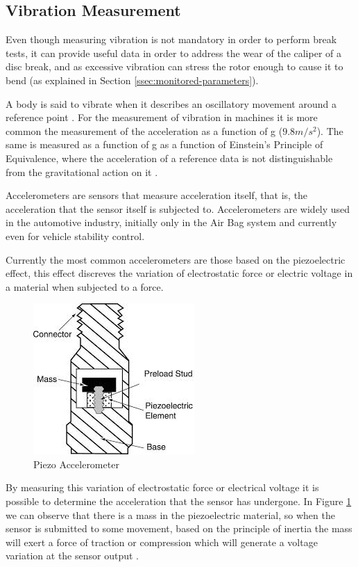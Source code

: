 \subsection{Vibration Measurement}\label{ssec:accelerometer}
		
		Even though measuring vibration is not mandatory in order to perform break tests, it can provide useful data in order to address the wear of the caliper of a disc break, and as excessive vibration can stress the rotor enough to cause it to bend (as explained in Section \ref{ssec:monitored-parameters}).
		\par
		A body is said to vibrate when it describes an oscillatory movement around a reference point \cite{joaocan2000}. For the measurement of vibration in machines it is more common the measurement of the acceleration as a function of g ($9.8m/s^2$). The same is measured as a function of g as a function of Einstein's Principle of Equivalence, where the acceleration of a reference data is not distinguishable from the gravitational action on it \cite{nordtvedt1968equivalence}.
		\par
		Accelerometers are sensors that measure acceleration itself, that is, the acceleration that the sensor itself is subjected to. Accelerometers are widely used in the automotive industry, initially only in the Air Bag system and currently even for vehicle stability control.
		\par
		Currently the most common accelerometers are those based on the piezoelectric effect, this effect discreves the variation of electrostatic force or electric voltage in a material when subjected to a force.

		\begin{figure}[htbp]
			\centering
				\includegraphics[scale=0.95]{figuras/fig-piezo-acel.jpg}
			\caption{Piezo Accelerometer \cite{piezo-accel}}
			\label{fig:piezoAccelerometer}
		\end{figure}

		By measuring this variation of electrostatic force or electrical voltage it is possible to determine the acceleration that the sensor has undergone. In Figure \ref{fig:piezoAccelerometer} we can observe that there is a mass in the piezoelectric material, so when the sensor is submitted to some movement, based on the principle of inertia the mass will exert a force of traction or compression which will generate a voltage variation at the sensor output \cite{patrick2006}.
